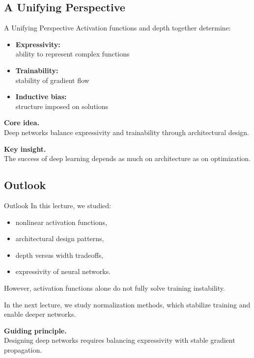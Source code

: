\documentclass[aspectratio=169,11pt]{beamer}
\begin{document}
\subsection{A Unifying Perspective}
\begin{frame}[t,allowframebreaks]{A Unifying Perspective}
\small
Activation functions and depth together determine:

\begin{itemize}
    \item \textbf{Expressivity:}\\ ability to represent complex functions
    \item \textbf{Trainability:}\\ stability of gradient flow
    \item \textbf{Inductive bias:}\\ structure imposed on solutions
\end{itemize}

\textbf{Core idea.}\\ Deep networks balance expressivity and trainability through architectural design.

\textbf{Key insight.}\\ The success of deep learning depends as much on architecture as on optimization.
\end{frame}

\subsection{Outlook}
\begin{frame}[t,allowframebreaks]{Outlook}
\small
In this lecture, we studied:

\begin{itemize}
    \item nonlinear activation functions,
    \item architectural design patterns,
    \item depth versus width tradeoffs,
    \item expressivity of neural networks.
\end{itemize}

However, activation functions alone do not fully solve training instability.

In the next lecture, we study normalization methods, which stabilize training and enable deeper networks.

\textbf{Guiding principle.}\\ Designing deep networks requires balancing expressivity with stable gradient propagation.
\end{frame}
\end{document}
